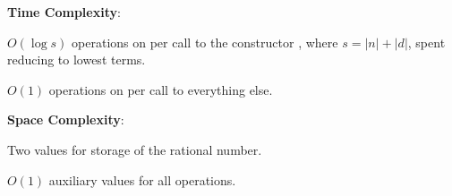 \textbf{Time Complexity}:
\begin{compactitem}
  \item $O(\log s)$ operations on  per call to the constructor , where $s = |n| + |d|$, spent reducing to lowest terms.
  \item $O(1)$ operations on  per call to everything else.
\end{compactitem}

\textbf{Space Complexity}:
\begin{compactitem}
  \item Two  values for storage of the rational number.
  \item $O(1)$ auxiliary  values for all operations.
\end{compactitem}

